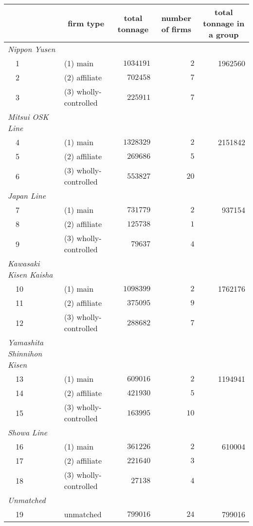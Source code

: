 \begin{tabular}{llrrr}
\toprule
\multicolumn{1}{l}{}&\multicolumn{1}{c}{firm type}&\multicolumn{1}{c}{total tonnage}&\multicolumn{1}{c}{number of firms}&\multicolumn{1}{c}{total tonnage in a group}\tabularnewline
\midrule
{\itshape Nippon Yusen}&&&&\tabularnewline
~~1&(1) main&$1034191$&$ 2$&1962560\tabularnewline
~~2&(2) affiliate&$ 702458$&$ 7$&\tabularnewline
~~3&(3) wholly-controlled&$ 225911$&$ 7$&\tabularnewline
\midrule
{\itshape Mitsui OSK Line}&&&&\tabularnewline
~~4&(1) main&$1328329$&$ 2$&2151842\tabularnewline
~~5&(2) affiliate&$ 269686$&$ 5$&\tabularnewline
~~6&(3) wholly-controlled&$ 553827$&$20$&\tabularnewline
\midrule
{\itshape Japan Line}&&&&\tabularnewline
~~7&(1) main&$ 731779$&$ 2$&937154\tabularnewline
~~8&(2) affiliate&$ 125738$&$ 1$&\tabularnewline
~~9&(3) wholly-controlled&$  79637$&$ 4$&\tabularnewline
\midrule
{\itshape Kawasaki Kisen Kaisha}&&&&\tabularnewline
~~10&(1) main&$1098399$&$ 2$&1762176\tabularnewline
~~11&(2) affiliate&$ 375095$&$ 9$&\tabularnewline
~~12&(3) wholly-controlled&$ 288682$&$ 7$&\tabularnewline
\midrule
{\itshape Yamashita Shinnihon Kisen}&&&&\tabularnewline
~~13&(1) main&$ 609016$&$ 2$&1194941\tabularnewline
~~14&(2) affiliate&$ 421930$&$ 5$&\tabularnewline
~~15&(3) wholly-controlled&$ 163995$&$10$&\tabularnewline
\midrule
{\itshape Showa Line}&&&&\tabularnewline
~~16&(1) main&$ 361226$&$ 2$&610004\tabularnewline
~~17&(2) affiliate&$ 221640$&$ 3$&\tabularnewline
~~18&(3) wholly-controlled&$  27138$&$ 4$&\tabularnewline
\midrule
{\itshape Unmatched}&&&&\tabularnewline
~~19&unmatched&$ 799016$&$24$&799016\tabularnewline
\bottomrule
\end{tabular}
